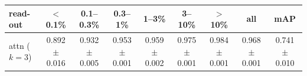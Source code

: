 \begin{tabular}{lcccccccc}
\toprule
read-out & $<$0.1\% & 0.1--0.3\% & 0.3--1\% & 1--3\% & 3--10\% & $>$10\% & all & mAP \\
\midrule
attn ($k=3$) & 0.892 $\pm$ 0.016 & 0.932 $\pm$ 0.005 & 0.953 $\pm$ 0.001 & 0.959 $\pm$ 0.002 & 0.975 $\pm$ 0.001 & 0.984 $\pm$ 0.001 & 0.968 $\pm$ 0.001 & 0.741 $\pm$ 0.010 \\
\bottomrule
\end{tabular}
